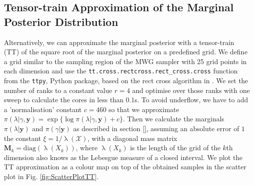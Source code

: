 
\subsection{Tensor-train Approximation of the Marginal Posterior Distribution}
\label{sec:firstMargTT}
Alternatively, we can approximate the marginal posterior with a tensor-train (TT) of the square root of the marginal posterior on a predefined grid.
We define a grid similar to the sampling region of the MWG sampler with 25 grid points in each dimension and use the \texttt{tt.cross.rectcross.rect\_cross.cross} function from the \texttt{ttpy}\cite{Oseledets2018ttpy}, Python package, based on the rect cross algorithm in \cite{OSELEDETS2010TTCross}.
We set the number of ranks to a constant value $r = 4$ and optimise over those ranks with one sweep to calculate the cores in less than $0.1$s.
To avoid underflow, we have to add a 'normalisation' constant $c = 460$ so that we approximate $\pi(\lambda | \gamma ,\bm{y}) = \exp\{ \log{\pi(\lambda | \gamma, \bm{y})} + c\}$.
Then we calculate the marginals $\pi(\lambda| \bm{y})$ and $\pi(\gamma| \bm{y})$ as described in section \ref{}, assuming an absolute error of $1$ the constant $\xi = 1/ \uplambda(\mathcal{X}) $, with a diagonal mass matrix $\bm{M}_k=  \text{diag}(\uplambda(X_k))$, where $\uplambda(X_k)$ is the length of the grid of the $k$th dimension also knows as the Lebesgue measure of a closed interval.
We plot the TT approximation as a colour map on top of the obtained samples in the scatter plot in Fig. \ref{fig:ScatterPlotTT}.

